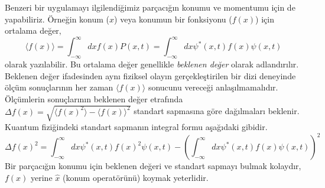 \documentclass[a4paper,12pt, twoside]{article}
\begin{document}
Benzeri bir uygulamayı ilgilendiğimiz parçacığın konumu ve momentumu için de yapabiliriz. Örneğin konum ($x$) veya konumun bir fonksiyonu ($f(x)$) için ortalama değer,
\begin{equation}
\langle f(x) \rangle =\int ^{\infty }_{-\infty }dx f(x) P\left( x,t\right) =\int ^{\infty }_{-\infty }dx \psi^{\ast }\left(x,t\right) f(x) \psi \left( x,t\right)
\label{eq:expactation_value}
\end{equation}
olarak yazılabilir. Bu ortalama değer genellikle \emph{beklenen değer} olarak adlandırılır. Beklenen değer ifadesinden aynı fiziksel olayın gerçekleştirilen bir dizi deneyinde ölçüm sonuçlarının her zaman $\langle f(x) \rangle$ sonucunu vereceği anlaşılmamalıdır. Ölçümlerin sonuçlarının beklenen değer etrafında $\Delta f(x) = \sqrt{\langle f(x)^2 \rangle - \langle f(x) \rangle^2}$ standart sapmasına göre dağılmaları beklenir. Kuantum fiziğindeki standart sapmanın integral formu aşağıdaki gibidir.
\begin{equation}
\Delta f(x)^2 = \int ^{\infty }_{-\infty }dx \psi^{\ast }\left(x,t\right) f(x)^2 \psi \left( x,t\right) -\left( \int ^{\infty }_{-\infty }dx \psi^{\ast }\left(x,t\right) f(x) \psi \left( x,t\right)\right)^2
\end{equation}
Bir parçacığın konumu için beklenen değeri ve standart sapmayı bulmak kolaydır, $f(x)$ yerine $\hat x$ (konum operatörünü) koymak yeterlidir. 
\end{document}
